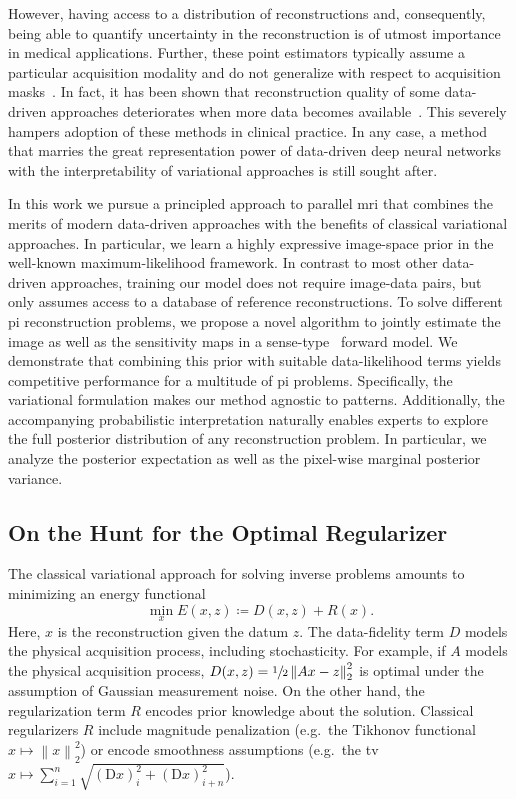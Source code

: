 \documentclass[twocolumn]{article}
\newcommand{\norm}[1]{\left\lVert#1\right\rVert}
\begin{document}
However, having access to a distribution of reconstructions and, consequently, being able to quantify uncertainty in the reconstruction is of utmost importance in medical applications.
Further, these point estimators typically assume a particular acquisition modality and do not generalize with respect to acquisition masks~\cite{chung_scoremri_2022}.
In fact, it has been shown that reconstruction quality of some data-driven approaches deteriorates when more data becomes available~\cite{Antun2020}.
This severely hampers adoption of these methods in clinical practice.
In any case, a method that marries the great representation power of data-driven deep neural networks with the interpretability of variational approaches is still sought after.

In this work we pursue a principled approach to parallel \gls{mri} that combines the merits of modern data-driven approaches with the benefits of classical variational approaches.
In particular, we learn a highly expressive image-space prior in the well-known maximum-likelihood framework.
In contrast to most other data-driven approaches, training our model does not require image-data pairs, but only assumes access to a database of reference reconstructions.
To solve different \gls{pi} reconstruction problems, we propose a novel algorithm to jointly estimate the image as well as the sensitivity maps in a \gls{sense}-type~\cite{pruessmann} forward model.
We demonstrate that combining this prior with suitable data-likelihood terms yields competitive performance for a multitude of \gls{pi} problems.
Specifically, the variational formulation makes our method agnostic to  patterns.
Additionally, the accompanying probabilistic interpretation naturally enables experts to explore the full posterior distribution of any reconstruction problem.
In particular, we analyze the posterior expectation as well as the pixel-wise marginal posterior variance.

\subsection{On the Hunt for the Optimal Regularizer}
The classical variational approach for solving inverse problems amounts to minimizing an energy functional
\begin{equation}
	\min_x E(x, z) \coloneqq D(x, z) + R(x).%
	\label{eq:variational}
\end{equation}
Here, \( x \) is the reconstruction given the datum \( z \).
The data-fidelity term \( D \) models the physical acquisition process, including stochasticity.
For example, if \( A \) models the physical acquisition process, \( D(x, z) = \sfrac{1}{2}\norm{Ax - z}_2^2 \) is optimal under the assumption of Gaussian measurement noise.
On the other hand, the regularization term \( R \) encodes prior knowledge about the solution.
Classical regularizers \( R \) include magnitude penalization (e.g.\ the Tikhonov functional \( x \mapsto \norm{x}_2^2 \)) or encode smoothness assumptions (e.g.\ the \gls{tv} \( x \mapsto \sum_{i=1}^n \sqrt{{(\mathrm{D} x)}_{i}^2 + {(\mathrm{D} x)}_{i + n}^2} \)).
\end{document}
